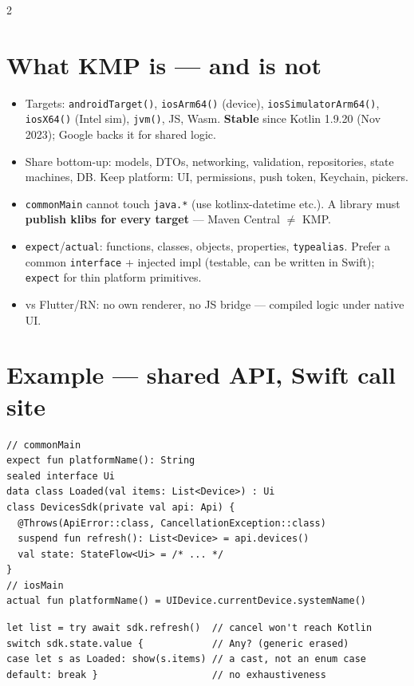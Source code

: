 \documentclass[8pt]{extarticle}
\begin{document}
\begin{multicols}{2}
\raggedright

\section{What KMP is — and is not}
\begin{itemize}\raggedright
  \item Targets: \texttt{androidTarget()}, \texttt{iosArm64()} (device),
        \texttt{iosSimulatorArm64()}, \texttt{iosX64()} (Intel sim), \texttt{jvm()}, JS,
        Wasm. \textbf{Stable} since Kotlin 1.9.20 (Nov 2023); Google backs it for shared
        logic.
  \item Share bottom-up: models, DTOs, networking, validation, repositories, state
        machines, DB. Keep platform: UI, permissions, push token, Keychain, pickers.
  \item \texttt{commonMain} cannot touch \texttt{java.*} (use kotlinx-datetime etc.). A
        library must \textbf{publish klibs for every target} — Maven Central $\neq$ KMP.
  \item \texttt{expect}/\texttt{actual}: functions, classes, objects, properties,
        \texttt{typealias}. Prefer a common \texttt{interface} + injected impl (testable,
        can be written in Swift); \texttt{expect} for thin platform primitives.
  \item vs Flutter/RN: no own renderer, no JS bridge — compiled logic under native UI.
\end{itemize}

\section{Example — shared API, Swift call site}
\begin{lstlisting}[language=KotlinSheet]
// commonMain
expect fun platformName(): String
sealed interface Ui
data class Loaded(val items: List<Device>) : Ui
class DevicesSdk(private val api: Api) {
  @Throws(ApiError::class, CancellationException::class)
  suspend fun refresh(): List<Device> = api.devices()
  val state: StateFlow<Ui> = /* ... */
}
// iosMain
actual fun platformName() = UIDevice.currentDevice.systemName()
\end{lstlisting}
\vspace{-3pt}
\begin{lstlisting}[language=SwiftSheet]
let list = try await sdk.refresh()  // cancel won't reach Kotlin
switch sdk.state.value {            // Any? (generic erased)
case let s as Loaded: show(s.items) // a cast, not an enum case
default: break }                    // no exhaustiveness
\end{lstlisting}


\end{multicols}
\end{document}
